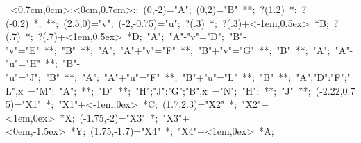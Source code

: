 
%

\hbox{
\xy    <0.7cm,0cm>:<0cm,0.7cm>::
       (0,-2)="A"; (0,2)="B"  **\dir{-}; ?(1.2) 
       *\dir{>}; ?(-0.2) *\dir{<}; **\dir{-};
       (2.5,0)="v"; (-2,-0.75)="u"; 
       ?(.3) *{\bullet}; ?(.3)+<-1em,0.5ex> *{B};
       ?(.7) *{\bullet}; ?(.7)+<1em,0.5ex> *{D};
       "A"; "A"-"v"="D"; "B"-"v"="E" **\dir{-}; 
       "B" **\dir{-};
       "A"; "A"+"v"="F" **\dir{-}; "B"+"v"="G" **\dir{-};
       "B" **\dir{-};
       "A"; "A"-"u"="H" **\dir{--}; "B"-"u"="J";
       "B" **\dir{-};
       "A"; "A"+"u"="F" **\dir{-}; "B"+"u"="L" **\dir{-};
       "B" **\dir{-};
       {"A";"D":"F";"L",x} ="M"; "A"; **\dir{--}; "D" **\dir{-};
       {"H";"J":"G";"B",x} ="N"; "H"; **\dir{--}; "J" **\dir{-};
       (-2.22,0.75)="X1" *{\bullet}; "X1"+<-1em,0ex> *{C}; 
       (1.7,2.3)="X2" *{\bullet}; "X2"+<1em,0ex> *{X}; 
       (-1.75,-2)="X3" *{\bullet}; "X3"+<0em,-1.5ex> *{Y}; 
       (1.75,-1.7)="X4" *{\bullet}; "X4"+<1em,0ex> *{A}; 
       \endxy}
